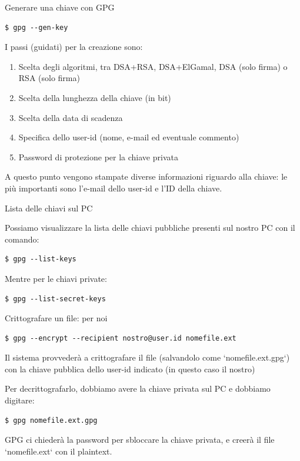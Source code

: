 \documentclass[10pt]{beamer}
\begin{document}
\begin{frame}[fragile]{Generare una chiave con GPG}

\begin{verbatim}
$ gpg --gen-key
\end{verbatim}

I passi (guidati) per la creazione sono:

\begin{enumerate}

\item Scelta degli algoritmi, tra DSA+RSA, DSA+ElGamal, DSA (solo firma) o RSA (solo firma)
\item Scelta della lunghezza della chiave (in bit)
\item Scelta della data di scadenza
\item Specifica dello user-id (nome, e-mail ed eventuale commento)
\item Password di protezione per la chiave privata

\end{enumerate}

A questo punto vengono stampate diverse informazioni riguardo alla chiave: le più importanti sono l'e-mail dello user-id e l'ID della chiave.

\end{frame}

\begin{frame}[fragile]{Lista delle chiavi sul PC}

Possiamo visualizzare la lista delle chiavi pubbliche presenti sul nostro PC con il comando:

\begin{verbatim}
$ gpg --list-keys
\end{verbatim}

Mentre per le chiavi private:

\begin{verbatim}
$ gpg --list-secret-keys
\end{verbatim}

\end{frame}

\begin{frame}[fragile]{Crittografare un file: per noi}

\begin{verbatim}
$ gpg --encrypt --recipient nostro@user.id nomefile.ext
\end{verbatim}

Il sistema provvederà a crittografare il file (salvandolo come `nomefile.ext.gpg`) con la chiave pubblica dello user-id indicato (in questo caso il nostro)

Per decrittografarlo, dobbiamo avere la chiave privata sul PC e dobbiamo digitare:

\begin{verbatim}
$ gpg nomefile.ext.gpg
\end{verbatim}

GPG ci chiederà la password per sbloccare la chiave privata, e creerà il file `nomefile.ext` con il plaintext.

\end{frame}
\end{document}
